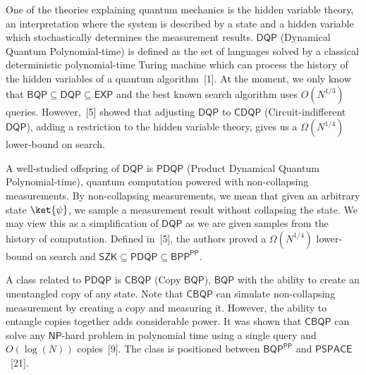 \documentclass[10pt,a4paper]{article}
\begin{document}
One of the theories explaining quantum mechanics is the hidden variable theory, an interpretation where the system is described by a state and a hidden variable which stochastically determines the measurement results. $\mathsf{DQP}$ (Dynamical Quantum Polynomial-time) is defined as the set of languages solved by a classical deterministic polynomial-time Turing machine which can process the history of the hidden variables of a quantum algorithm [1]. At the moment, we only know that $\mathsf{BQP}\subseteq\mathsf{DQP}\subseteq\mathsf{EXP}$ and the best known search algorithm uses $O(N^{1/3})$ queries. However, [5] showed that adjusting $\mathsf{DQP}$ to $\mathsf{CDQP}$ (Circuit-indifferent $\mathsf{DQP}$), adding a restriction to the hidden variable theory, gives us a $\Omega(N^{1/4})$ lower-bound on search.\par




A well-studied offspring of $\mathsf{DQP}$ is $\mathsf{PDQP}$ (Product Dynamical Quantum Polynomial-time), quantum computation powered with non-collapsing measurements. By non-collapsing measurements, we mean that given an arbitrary state $\ket{\psi}$, we sample a measurement result without collapsing the state.
We may view this as a simplification of $\mathsf{DQP}$ as we are given samples from the history of computation. Defined in [5], the authors proved a $\Omega(N^{1/4})$ lower-bound on search and $\mathsf{SZK}\subseteq\mathsf{PDQP}\subseteq\mathsf{BPP}^{\mathsf{PP}}$.\par




A class related to $\mathsf{PDQP}$ is $\mathsf{CBQP}$ (Copy $\mathsf{BQP}$), $\mathsf{BQP}$ with the ability to create an unentangled copy of any state. Note that $\mathsf{CBQP}$ can simulate non-collapsing measurement by creating a copy and measuring it. However, the ability to entangle copies together adds considerable power. It was shown that $\mathsf{CBQP}$ can solve any $\mathsf{NP}$-hard problem in polynomial time using a single query and $O(\log(N))$ copies [9]. The class is positioned between $\mathsf{BQP}^{\mathsf{PP}}$ and $\mathsf{PSPACE}$ [21].\par
\end{document}
